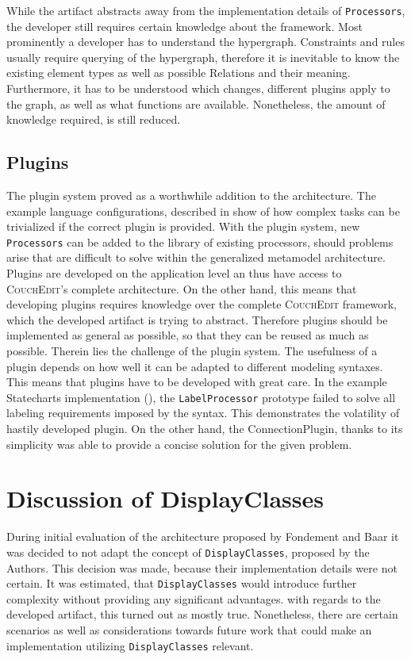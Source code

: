 While the artifact abstracts away from the implementation details of \texttt{Processors}, the developer still requires certain knowledge about the framework. Most prominently a developer has to understand the hypergraph. Constraints and rules usually require querying of the hypergraph, therefore it is inevitable to know the existing element types as well as possible Relations and their meaning. Furthermore, it has to be understood which changes, different plugins apply to the graph, as well as what functions are available. Nonetheless, the amount of knowledge required, is still reduced.

\subsection{Plugins}
The plugin system proved as a worthwhile addition to the architecture. The example language configurations, described in  show of how complex tasks can be trivialized if the correct plugin is provided. With the plugin system, new \texttt{Processors} can be added to the library of existing processors, should problems arise that are difficult to solve within the generalized metamodel architecture. Plugins are developed on the application level an thus have access to \textsc{CouchEdit}'s complete architecture. On the other hand, this means that developing plugins requires knowledge over the complete \textsc{CouchEdit} framework, which the developed artifact is trying to abstract. Therefore plugins should be implemented as general as possible, so that they can be reused as much as possible. Therein lies the challenge of the plugin system. The usefulness of a plugin depends on how well it can be adapted to different modeling syntaxes. This means that plugins have to be developed with great care. In the example Statecharts implementation (), the \texttt{LabelProcessor} prototype failed to solve all labeling requirements imposed by the syntax. This demonstrates the volatility of hastily developed plugin. On the other hand, the ConnectionPlugin, thanks to its simplicity was able to provide a concise solution for the given problem.

\section{Discussion of DisplayClasses}
\label{sec:dc-disc}
During initial evaluation of the architecture proposed by Fondement and Baar \cite{fondement_making_2005} it was decided to not adapt the concept of \texttt{DisplayClasses}, proposed by the Authors. This decision was made, because their implementation details were not certain. It was estimated, that \texttt{DisplayClasses} would introduce further complexity without providing any significant advantages. with regards to the developed artifact, this turned out as mostly true. Nonetheless, there are certain scenarios as well as considerations towards future work that could make an implementation utilizing \texttt{DisplayClasses} relevant.

